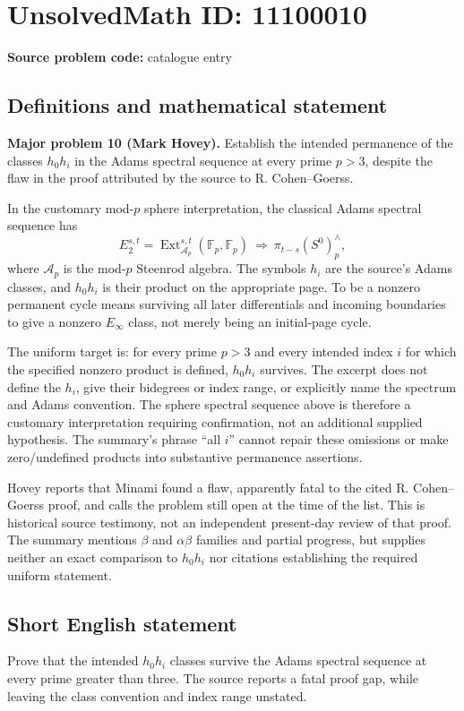 \documentclass[11pt]{article}
\newcommand{\F}{\mathbb{F}}
\begin{document}
\section*{UnsolvedMath ID: 11100010}
\textbf{Source problem code:} catalogue entry
\subsection{Definitions and mathematical statement}
\textbf{Major problem 10 (Mark Hovey).} Establish the intended permanence of the classes $h_0h_i$ in the Adams spectral sequence at every prime $p>3$, despite the flaw in the proof attributed by the source to R. Cohen--Goerss.

In the customary mod-$p$ sphere interpretation, the classical Adams spectral sequence has
\[
 E_2^{s,t}=\operatorname{Ext}_{\mathcal A_p}^{s,t}(\F_p,\F_p)
 \ \Longrightarrow\ \pi_{t-s}(S^0)^{\wedge}_p,
\]
where $\mathcal A_p$ is the mod-$p$ Steenrod algebra. The symbols $h_i$ are the source's Adams classes, and $h_0h_i$ is their product on the appropriate page. To be a nonzero permanent cycle means surviving all later differentials and incoming boundaries to give a nonzero $E_\infty$ class, not merely being an initial-page cycle.

The uniform target is: for every prime $p>3$ and every intended index $i$ for which the specified nonzero product is defined, $h_0h_i$ survives. The excerpt does not define the $h_i$, give their bidegrees or index range, or explicitly name the spectrum and Adams convention. The sphere spectral sequence above is therefore a customary interpretation requiring confirmation, not an additional supplied hypothesis. The summary's phrase ``all $i$'' cannot repair these omissions or make zero/undefined products into substantive permanence assertions.

Hovey reports that Minami found a flaw, apparently fatal to the cited R. Cohen--Goerss proof, and calls the problem still open at the time of the list. This is historical source testimony, not an independent present-day review of that proof. The summary mentions $\beta$ and $\alpha\beta$ families and partial progress, but supplies neither an exact comparison to $h_0h_i$ nor citations establishing the required uniform statement.
\subsection{Short English statement}
Prove that the intended $h_0h_i$ classes survive the Adams spectral sequence at every prime greater than three. The source reports a fatal proof gap, while leaving the class convention and index range unstated.
\end{document}
